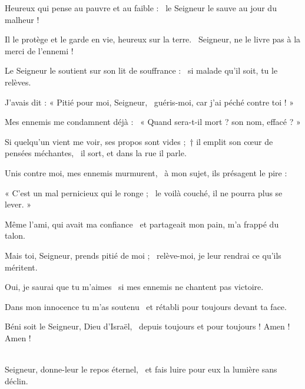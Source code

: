 \item Heureux qui pense au pauvre et au faible :~\psstar{} le Seigneur le sauve au jour du malheur !

\item Il le protège et le garde en vie, heureux sur la terre.~\psstar{} Seigneur, ne le livre pas à la merci de l'ennemi !

\item Le Seigneur le soutient sur son lit de souffrance :~\psstar{} si malade qu'il soit, tu le relèves.

\item J'avais dit : « Pitié pour moi, Seigneur,~\psstar{} guéris-moi, car j'ai péché contre toi ! »

\item Mes ennemis me condamnent déjà :~\psstar{} « Quand sera-t-il mort ? son nom, effacé ? »

\item Si quelqu'un vient me voir, ses propos sont vides ;~† il emplit son cœur de pensées méchantes,~\psstar{} il sort, et dans la rue il parle.

\item Unis contre moi, mes ennemis murmurent,~\psstar{} à mon sujet, ils présagent le pire :

\item « C'est un mal pernicieux qui le ronge ;~\psstar{} le voilà couché, il ne pourra plus se lever. »

\item Même l'ami, qui avait ma confiance~\psstar{} et partageait mon pain, m'a frappé du talon.

\item Mais toi, Seigneur, prends pitié de moi ;~\psstar{} relève-moi, je leur rendrai ce qu'ils méritent.

\item Oui, je saurai que tu m'aimes~\psstar{} si mes ennemis ne chantent pas victoire.

\item Dans mon innocence tu m'as soutenu~\psstar{} et rétabli pour toujours devant ta face.

\item Béni soit le Seigneur, Dieu d'Israël,~\psstar{} depuis toujours et pour toujours ! Amen ! Amen !

\item ~\\Seigneur, donne-leur le repos éternel,~\psstar{} et fais luire pour eux la lumière sans déclin.